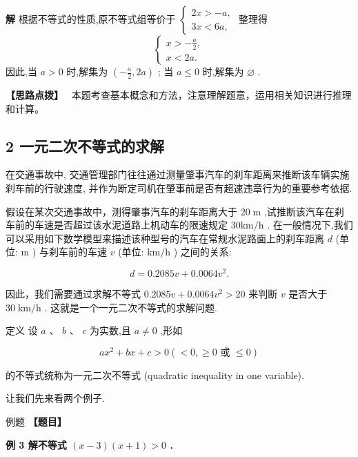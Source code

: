 \documentclass[a4paper,10pt,oneside,fontset=none]{ctexbook}
\renewcommand{\geq}{\geqslant}
\renewcommand{\leq}{\leqslant}
\newcounter{example}[chapter]
\newenvironment{example}[1][]{\begin{exBox}{例题}{#1}}{\end{exBox}}
\numberwithin{equation}{chapter}
\newenvironment{solution}{\begin{solutionBox}}{\end{solutionBox}}
\newenvironment{hint}{\begin{hintBox}\textbf{【思路点拨】}~}{\end{hintBox}}
\begin{document}
\begin{solution}
\textbf{解}
根据不等式的性质,原不等式组等价于 $\left\{  \begin{array}{l} {2x} >  - a, \\  {3x} < {6a}, \end{array}\right.$ 整理得
$$
\left\{  \begin{array}{l} x >  - \frac{a}{2}, \\  x < {2a}. \end{array}\right.
$$
因此,当 $a > 0$ 时,解集为 $\left( {-\frac{a}{2},{2a}}\right)$ ; 当 $a \leq  0$ 时,解集为 $\varnothing$ .
\end{solution}

\begin{hint}
本题考查基本概念和方法，注意理解题意，运用相关知识进行推理和计算。
\end{hint}

\subsection{2 一元二次不等式的求解}

在交通事故中, 交通管理部门往往通过测量肇事汽车的刹车距离来推断该车辆实施刹车前的行驶速度, 并作为断定司机在肇事前是否有超速违章行为的重要参考依据.

假设在某次交通事故中，测得肇事汽车的刹车距离大于 ${20}\mathrm{\;m}$ ,试推断该汽车在刹车前的车速是否超过该水泥道路上机动车的限速规定 ${30}\mathrm{{km}}/\mathrm{h}$ . 在一般情况下,我们可以采用如下数学模型来描述该种型号的汽车在常规水泥路面上的刹车距离 $d$ (单位: $\mathrm{m}$ ) 与刹车前的车速 $v$ (单位: $\mathrm{{km}}/\mathrm{h}$ ) 之间的关系:

$$
d = {0.2085v} + {0.0064}{v}^{2}.
$$

因此，我们需要通过求解不等式 ${0.2085v} + {0.0064}{v}^{2} > {20}$ 来判断 $v$ 是否大于 ${30}\mathrm{\;{km}}/\mathrm{h}$ . 这就是一个一元二次不等式的求解问题.

定义 设 $a\text{ 、 }b\text{ 、 }c$ 为实数,且 $a \neq  0$ ,形如

$$
a{x}^{2} + {bx} + c > 0\left( { < 0, \geq  0\text{ 或 } \leq  0}\right)
$$

的不等式统称为一元二次不等式 (quadratic inequality in one variable).

让我们先来看两个例子.

\begin{example}
\textbf{【题目】}\par\vspace{0.3em}
\textbf{例 3 解不等式 $\left( {x - 3}\right) \left( {x + 1}\right)  > 0$ .}\par\vspace{0.3em}
\end{example}
\end{document}
